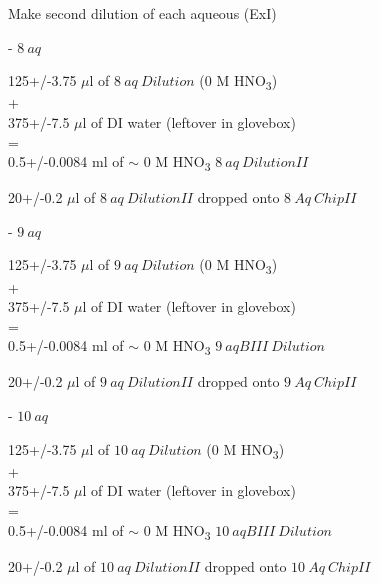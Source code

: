\documentclass[idxtotoc,hyperref,openany,oneside]{labbook} %
\newcommand{\cmark}{\ding{51}}%
\newcommand{\done}{\rlap{$\square$}{\raisebox{2pt}{\large\hspace{1pt}\cmark}}%
  \hspace{-2.5pt}}
\newcommand{\tsbs}{\textsubscript}
\begin{document}
\begin{todolist}
\item[\done]{Make second dilution of each aqueous (ExI)}
  \begin{todolist}
  \item[\done]{- $\boxed{8\ aq}$}
  \end{todolist}
  \begin{center}
    125+/-3.75 $\mu$l of $\boxed{8\ aq\ Dilution}$
    (0 M HNO\tsbs{3})\\
    +\\
    375+/-7.5 $\mu$l of DI water (leftover in glovebox)\\
    =\\
    0.5+/-0.0084 ml of $\sim$
    0 M HNO\tsbs{3} $\boxed{8\ aq\ DilutionII}$
  \end{center}
  \begin{center}
  20+/-0.2 $\mu$l of $\boxed{8\ aq\ DilutionII}$ dropped onto
  $\boxed{8\ Aq\ ChipII}$
  \end{center}
  \begin{todolist}
  \item[\done]{- $\boxed{9\ aq}$}
  \end{todolist}
  \begin{center}
    125+/-3.75 $\mu$l of $\boxed{9\ aq\ Dilution}$
    (0 M HNO\tsbs{3})\\
    +\\
    375+/-7.5 $\mu$l of DI water (leftover in glovebox)\\
    =\\
    0.5+/-0.0084 ml of $\sim$
    0 M HNO\tsbs{3} $\boxed{9\ aqBIII\ Dilution}$
  \end{center}
  \begin{center}
  20+/-0.2 $\mu$l of $\boxed{9\ aq\ DilutionII}$ dropped onto
  $\boxed{9\ Aq\ ChipII}$
  \end{center}
  \begin{todolist}
  \item[\done]{- $\boxed{10\ aq}$}
  \end{todolist}
  \begin{center}
    125+/-3.75 $\mu$l of $\boxed{10\ aq\ Dilution}$
    (0 M HNO\tsbs{3})\\
    +\\
    375+/-7.5 $\mu$l of DI water (leftover in glovebox)\\
    =\\
    0.5+/-0.0084 ml of $\sim$
    0 M HNO\tsbs{3} $\boxed{10\ aqBIII\ Dilution}$
  \end{center}
  \begin{center}
  20+/-0.2 $\mu$l of $\boxed{10\ aq\ DilutionII}$ dropped onto
  $\boxed{10\ Aq\ ChipII}$
  \end{center}
\end{todolist}
\end{document}
